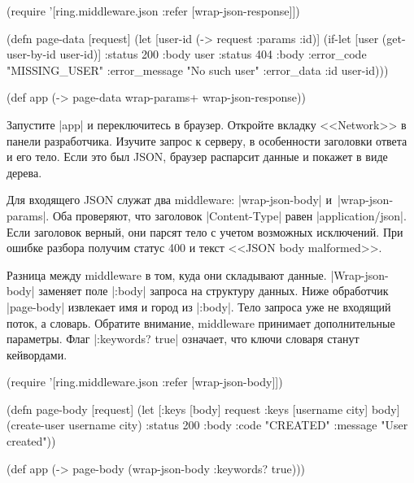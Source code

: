 \begin{english}
  \begin{clojure}
(require '[ring.middleware.json
           :refer [wrap-json-response]])

(defn page-data [request]
  (let [user-id (-> request :params :id)]
    (if-let [user (get-user-by-id user-id)]
      {:status 200 :body user}
      {:status 404
       :body {:error_code "MISSING_USER"
              :error_message "No such user"
              :error_data {:id user-id}}})))

(def app (-> page-data
             wrap-params+
             wrap-json-response))
  \end{clojure}
\end{english}

Запустите \spverb|app| и переключитесь в браузер. Откройте вкладку <<Network>> в
панели разработчика. Изучите запрос к серверу, в особенности заголовки ответа и
его тело. Если это был JSON, браузер распарсит данные и покажет в виде дерева.

Для входящего JSON служат два middleware: \spverb|wrap-json-body|
и~\spverb|wrap-json-params|. Оба проверяют, что заголовок \spverb|Content-Type|
равен \spverb|application/json|. Если заголовок верный, они парсят тело с учетом
возможных исключений. При ошибке разбора получим статус 400 и текст <<JSON body
malformed>>.

Разница между middleware в том, куда они складывают
данные. \spverb|Wrap-json-body| заменяет поле \spverb|:body| запроса на
структуру данных. Ниже обработчик \spverb|page-body| извлекает имя и город из
\spverb|:body|. Тело запроса уже не входящий поток, а словарь. Обратите
внимание, middleware принимает дополнительные параметры. Флаг \spverb|:keywords? true|
означает, что ключи словаря станут кейвордами.

\begin{english}
  \begin{clojure}
(require '[ring.middleware.json :refer [wrap-json-body]])

(defn page-body [request]
  (let [{:keys [body]} request
        {:keys [username city]} body]
    (create-user username city)
    {:status 200
     :body {:code "CREATED"
            :message "User created"}}))

(def app (-> page-body
             (wrap-json-body {:keywords? true})))
  \end{clojure}
\end{english}


